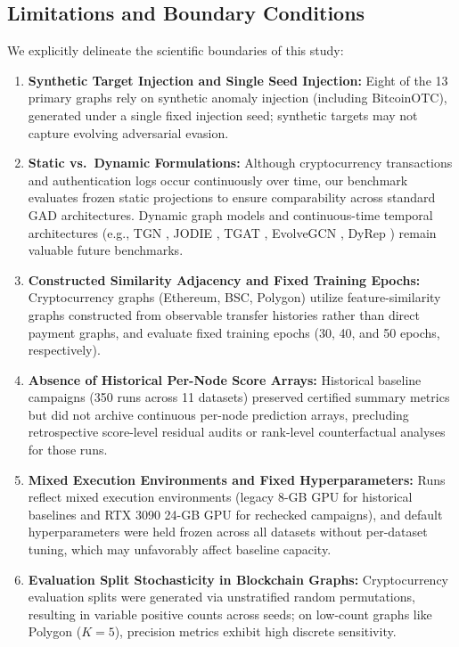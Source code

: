 \documentclass[11pt,a4paper]{article}
\begin{document}
\subsection{Limitations and Boundary Conditions}
We explicitly delineate the scientific boundaries of this study:
\begin{enumerate}
    \item \textbf{Synthetic Target Injection and Single Seed Injection:} Eight of the 13 primary graphs rely on synthetic anomaly injection (including BitcoinOTC), generated under a single fixed injection seed; synthetic targets may not capture evolving adversarial evasion.
    \item \textbf{Static vs.\ Dynamic Formulations:} Although cryptocurrency transactions and authentication logs occur continuously over time, our benchmark evaluates frozen static projections to ensure comparability across standard GAD architectures. Dynamic graph models and continuous-time temporal architectures (e.g., TGN \cite{rossi2020tgn}, JODIE \cite{kumar2019jodie}, TGAT \cite{xu2020tgat}, EvolveGCN \cite{pareja2020evolvegcn}, DyRep \cite{trivedi2019dyrep}) remain valuable future benchmarks.
    \item \textbf{Constructed Similarity Adjacency and Fixed Training Epochs:} Cryptocurrency graphs (Ethereum, BSC, Polygon) utilize feature-similarity graphs constructed from observable transfer histories rather than direct payment graphs, and evaluate fixed training epochs (30, 40, and 50 epochs, respectively).
    \item \textbf{Absence of Historical Per-Node Score Arrays:} Historical baseline campaigns (350 runs across 11 datasets) preserved certified summary metrics but did not archive continuous per-node prediction arrays, precluding retrospective score-level residual audits or rank-level counterfactual analyses for those runs.
    \item \textbf{Mixed Execution Environments and Fixed Hyperparameters:} Runs reflect mixed execution environments (legacy 8-GB GPU for historical baselines and RTX 3090 24-GB GPU for rechecked campaigns), and default hyperparameters were held frozen across all datasets without per-dataset tuning, which may unfavorably affect baseline capacity.
    \item \textbf{Evaluation Split Stochasticity in Blockchain Graphs:} Cryptocurrency evaluation splits were generated via unstratified random permutations, resulting in variable positive counts across seeds; on low-count graphs like Polygon ($K=5$), precision metrics exhibit high discrete sensitivity.
\end{enumerate}
\end{document}

